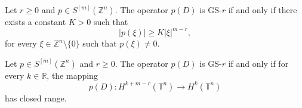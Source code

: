 \documentclass[10pt,a4paper]{amsart}
\begin{document}
	\begin{theorem}\label{theoGS}
		Let \( r \geq 0 \) and \( p \in S^{[m]}(\mathbb{Z}^n) \). The operator \( p(D) \) is GS-$r$ if and only if there exists a constant \( K > 0 \) such that
		\begin{equation}\label{ineq-GS}
			|p(\xi)|\geq K|\xi|^{m-r},
		\end{equation}
		for every \( \xi \in \mathbb{Z}^n \setminus \{0\} \) such that \( p(\xi) \neq 0 \).
	\end{theorem}

	\begin{theorem}\label{teoGS-closed}
		Let \( p \in S^{[m]}(\mathbb{Z}^n) \) and \( r \geq 0 \). The operator \( p(D) \) is GS-\( r \) if and only if for every \( k \in \mathbb{R} \), the mapping
		\[
		p(D): H^{k + m - r}(\mathbb{T}^n) \to H^k(\mathbb{T}^n)
		\]
		has closed range.
	\end{theorem}
\end{document}

